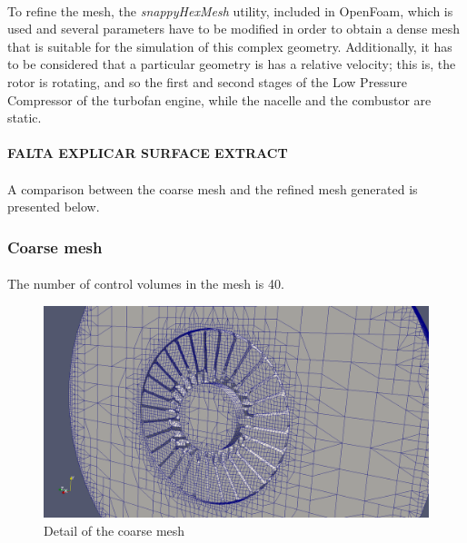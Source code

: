 \paragraph{}To refine the mesh, the \textit{snappyHexMesh} utility, included in OpenFoam, which is used and several parameters have to be modified in order to obtain a dense mesh that is suitable for the simulation of this complex geometry. Additionally, it has to be considered that a particular geometry is has a relative velocity; this is, the rotor is rotating, and so the first and second stages of the Low Pressure Compressor of the turbofan engine, while the nacelle and the combustor are static. 

\paragraph{}\textbf{FALTA EXPLICAR SURFACE EXTRACT}

\paragraph{}A comparison between the coarse mesh and the refined mesh generated is presented below.

\subsubsection{Coarse mesh}
\paragraph{}The number of control volumes in the mesh is 40.

\begin{figure}[h!]
\includegraphics[scale=0.26]{./mesh/screenshots/coarse2}
\centering
\caption{Detail of the coarse mesh}
\end{figure}

